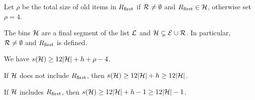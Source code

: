 \begin{lem}
\label{l:huge} 
Let $\rho$ be the total size of old items
in $R_{\mbox{\rm\scriptsize first}}$ if ${\mathcal R}\neq\emptyset$ and $R_{\mbox{\rm\scriptsize first}}\in{\mathcal H}$, otherwise set $\rho=4$.
\begin{compactenum}[\rm (i)]
\item \label{i:hspecial} 
The bins ${\mathcal H}$ are a final segment of the list ${\mathcal L}$ and
${\mathcal H}\subsetneq{\mathcal E}\cup{\mathcal R}$. In particular, ${\mathcal R}\neq\emptyset$
and $R_{\mbox{\rm\scriptsize first}}$ is defined.
\item \label{i:hr}
We have
$s({\mathcal H})\geq12|{\mathcal H}|+{h}+\rho-4$. 
\item \label{i:h}
If ${\mathcal H}$ does not include $R_{\mbox{\rm\scriptsize first}}$, then
$s({\mathcal H})\geq12|{\mathcal H}|+{h}\geq12|{\mathcal H}|$. 
\item \label{i:hfirst}
If ${\mathcal H}$ includes $R_{\mbox{\rm\scriptsize first}}$, then
$s({\mathcal H})\geq12|{\mathcal H}|+{h}-1\geq12|{\mathcal H}|-1$.
\end{compactenum} 
\end{lem}
